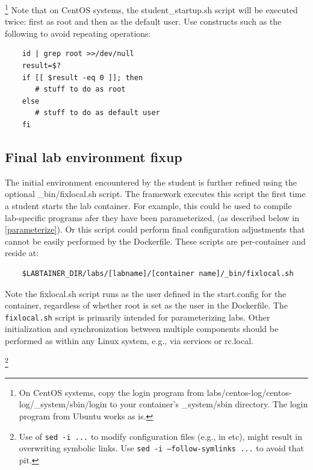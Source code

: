 \documentclass[12pt]{article}
\begin{document}
\footnote{On CentOS systems, copy the login program from labs/centos-log/centos-log/\_system/sbin/login
to your container's \_system/sbin directory. The login program from Ubuntu works as is.}
Note that on CentOS systems, the student\_startup.sh script will be executed twice: first
as root and then as the default user.  Use constructs such as the following to avoid repeating
operations:
\begin{verbatim}
    id | grep root >>/dev/null
    result=$?
    if [[ $result -eq 0 ]]; then
       # stuff to do as root
    else
       # stuff to do as default user
    fi
\end{verbatim}



\subsection{Final lab environment fixup}
The initial environment encountered by the student is further refined using
the optional \_bin/fixlocal.sh script.  The framework executes
this script the first time a student starts the lab container.  For example,
this could be used to compile lab-specific programs afer they have been parameterized,
(as described below in \ref{parameterize}).  Or this script could perform final configuration adjustments
that cannot be easily performed by the Dockerfile.  These scripts are per-container
and reside at:
\begin{verbatim}
    $LABTAINER_DIR/labs/[labname]/[container name]/_bin/fixlocal.sh
\end{verbatim}
\noindent Note the fixlocal.sh script runs as the user defined in the start.config for the container, 
regardless of whether root is set as the user in the Dockerfile.  The {\tt fixlocal.sh} script is primarily
intended for parameterizing labs.  Other initialization and synchronization between multiple components 
should be performed as within any Linux system, e.g., via services or rc.local.


\footnote{Use of {\tt sed -i ...} to modify configuration files (e.g., in etc), might result in overwriting symbolic links.
Use {\tt sed -i --follow-symlinks ...} to avoid that pit.}
\end{document}
